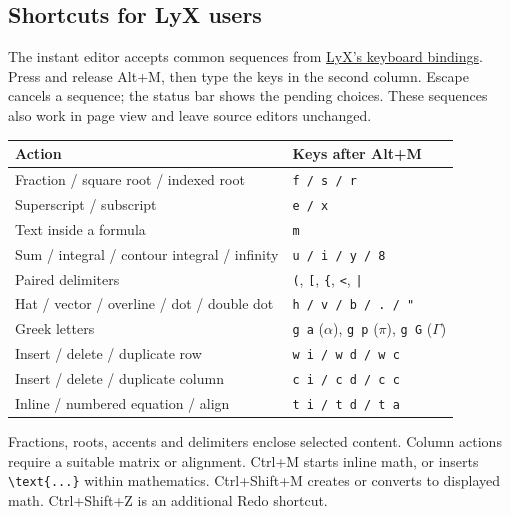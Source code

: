\documentclass[11pt]{article}
\begin{document}
\subsection{Shortcuts for LyX users}
The instant editor accepts common sequences from
\href{https://git.lyx.org/repos/lyx.git}{LyX's keyboard bindings}.
Press and release Alt+M, then type the keys in the second column.
Escape cancels a sequence; the status bar shows the pending choices.
These sequences also work in page view and leave source editors unchanged.
\begin{center}
\begin{tabular}{ll}
Action&Keys after Alt+M\\\hline
Fraction / square root / indexed root&\texttt{f / s / r}\\
Superscript / subscript&\texttt{e / x}\\
Text inside a formula&\texttt{m}\\
Sum / integral / contour integral / infinity&\texttt{u / i / y / 8}\\
Paired delimiters&\verb|(|, \verb|[|, \verb|{|, \verb|<|, \verb.|.\\
Hat / vector / overline / dot / double dot&\verb|h / v / b / . / "|\\
Greek letters&\texttt{g a} ($\alpha$), \texttt{g p} ($\pi$), \texttt{g G} ($\Gamma$)\\
Insert / delete / duplicate row&\texttt{w i / w d / w c}\\
Insert / delete / duplicate column&\texttt{c i / c d / c c}\\
Inline / numbered equation / align&\texttt{t i / t d / t a}\\
\end{tabular}
\end{center}
Fractions, roots, accents and delimiters enclose selected content. Column actions
require a suitable matrix or alignment. Ctrl+M starts inline math, or inserts
\verb|\text{...}| within mathematics. Ctrl+Shift+M creates or converts to displayed math.
Ctrl+Shift+Z is an additional Redo shortcut.
\end{document}
